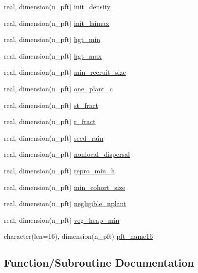 \begin{DoxyCompactItemize}
\item 
real, dimension(n\+\_\+pft) \hyperlink{namespacepft__coms_aad950f9e3b7c51796f0c72acbf85198d}{init\+\_\+density}
\item 
real, dimension(n\+\_\+pft) \hyperlink{namespacepft__coms_aee1c14f39841cdf40c9655ae6eab2e85}{init\+\_\+laimax}
\item 
real, dimension(n\+\_\+pft) \hyperlink{namespacepft__coms_aab740dc3cca80fdd00440b412f111a74}{hgt\+\_\+min}
\item 
real, dimension(n\+\_\+pft) \hyperlink{namespacepft__coms_a81703797d07f20bd129277ed6a78e30e}{hgt\+\_\+max}
\item 
real, dimension(n\+\_\+pft) \hyperlink{namespacepft__coms_a4a008038dd34f2531f2ca7637c6e74b0}{min\+\_\+recruit\+\_\+size}
\item 
real, dimension(n\+\_\+pft) \hyperlink{namespacepft__coms_a584bfab014a9ec5b4a5d7ed9e458df9f}{one\+\_\+plant\+\_\+c}
\item 
real, dimension(n\+\_\+pft) \hyperlink{namespacepft__coms_a24d6f9401bfd2a1127dbc4b957a6d94e}{st\+\_\+fract}
\item 
real, dimension(n\+\_\+pft) \hyperlink{namespacepft__coms_a588d74ddc11417f923b20d000e0740aa}{r\+\_\+fract}
\item 
real, dimension(n\+\_\+pft) \hyperlink{namespacepft__coms_a9e5f0badf00a834a699115fc8974d9f2}{seed\+\_\+rain}
\item 
real, dimension(n\+\_\+pft) \hyperlink{namespacepft__coms_ab4b143dec3e017f4e90ee99ca12bb329}{nonlocal\+\_\+dispersal}
\item 
real, dimension(n\+\_\+pft) \hyperlink{namespacepft__coms_a30fe0a0ce90033d81e78cc82c9b70017}{repro\+\_\+min\+\_\+h}
\item 
real, dimension(n\+\_\+pft) \hyperlink{namespacepft__coms_ae271b74cd105b2cf539a630a97cfc185}{min\+\_\+cohort\+\_\+size}
\item 
real, dimension(n\+\_\+pft) \hyperlink{namespacepft__coms_a35da186f9b0c1860742f4496333703a7}{negligible\+\_\+nplant}
\item 
real, dimension(n\+\_\+pft) \hyperlink{namespacepft__coms_a0bc569727ea7f49b70751189cb07d8fc}{veg\+\_\+hcap\+\_\+min}
\item 
character(len=16), dimension(n\+\_\+pft) \hyperlink{namespacepft__coms_abbfea830303582f918e1630cb7009694}{pft\+\_\+name16}
\end{DoxyCompactItemize}


\subsection{Function/\+Subroutine Documentation}
\mbox{\label{namespacepft__coms_a7d92f11102baa7fd26b952a5c9ea83fc}} 
